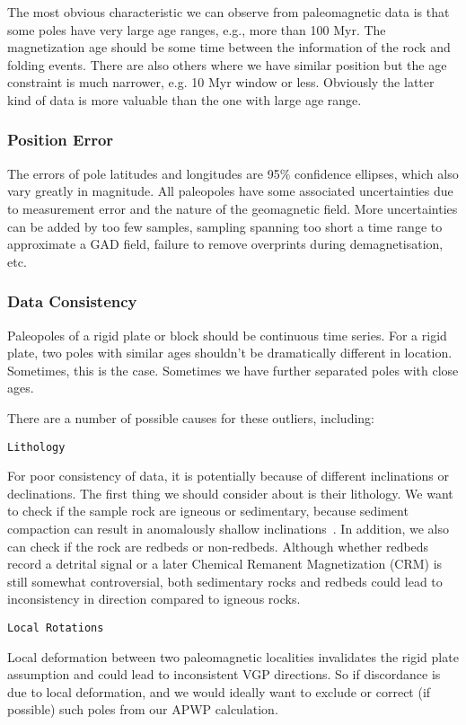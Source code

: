 The most obvious characteristic we can observe from paleomagnetic data is that
some poles have very large age ranges, e.g., more than 100 Myr. The
magnetization age should be some time between the information of the rock and
folding events. There are also others where we have similar position but the age
constraint is much narrower, e.g. 10 Myr window or less. Obviously the latter
kind of data is more valuable than the one with large age range.

\subsubsection{Position Error}

The errors of pole latitudes and longitudes are 95\% confidence ellipses, which
also vary greatly in magnitude. All paleopoles have some associated
uncertainties due to measurement error and the nature of the geomagnetic field.
More uncertainties can be added by too few samples, sampling spanning too short
a time range to approximate a GAD field, failure to remove overprints during
demagnetisation, etc.

\subsubsection{Data Consistency}

Paleopoles of a rigid plate or block should be continuous time series. For a
rigid plate, two poles with similar ages shouldn't be dramatically different in
location. Sometimes, this is the case. Sometimes we have further separated poles
with close ages.

There are a number of possible causes for these outliers, including:

\verb"Lithology"

For poor consistency of data, it is potentially because of different
inclinations or declinations. The first thing we should consider about is their
lithology. We want to check if the sample rock are igneous or sedimentary,
because sediment compaction can result in anomalously shallow
inclinations~\cite{T19}. In addition, we also can check if the rock are redbeds
or non-redbeds. Although whether redbeds record a detrital signal or a later
Chemical Remanent Magnetization (CRM) is still somewhat controversial, both
sedimentary rocks and redbeds could lead to inconsistency in direction compared
to igneous rocks.

\verb"Local Rotations"

Local deformation between two paleomagnetic localities invalidates the rigid
plate assumption and could lead to inconsistent VGP directions. So if
discordance is due to local deformation, and we would ideally want to exclude
or correct (if possible) such poles from our APWP calculation.

